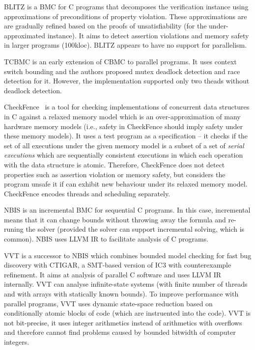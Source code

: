 BLITZ  is a BMC for C programs that decomposes the verification instance using approximations of preconditions of property violation.
These approximations are are gradually refined based on the proofs of unsatisfiability (for the under-approximated instance).
It aims to detect assertion violations and memory safety in larger programs (100kloc).
BLITZ appears to have no support for parallelism.

TCBMC  is an early extension of CBMC to parallel programs.
It uses context switch bounding and the authors proposed mutex deadlock detection and race detection for it.
However, the implementation supported only two theads without deadlock detection.

CheckFence~ is a tool for checking implementations of concurrent data structures in C against a relaxed memory model which is an over-approximation of many hardware memory models (i.e., safety in CheckFence should imply safety under these memory models).
It uses a test program as a specification -- it checks if the set of all executions under the given memory model is a subset of a set of \emph{serial executions} which are sequentially consistent executions in which each operation with the data structure is atomic.
Therefore, CheckFence does not detect properties such as assertion violation or memory safety, but considers the program unsafe it if can exhibit new behaviour under its relaxed memory model.
CheckFence encodes threads and scheduling separately.

NBIS  is an incremental BMC for sequential C programs.
In this case, incremental means that it can change bounds without throwing away the formula and re-runing the solver (provided the solver can support incremental solving, which is common).
NBIS uses LLVM IR to facilitate analysis of C programs.

VVT  is a successor to NBIS which combines bounded model checking for fast bug discovery with CTIGAR, a SMT-based version of IC3 with counterexample refinement.
It aims at analysis of parallel C software and uses LLVM IR internally.
VVT can analyse infinite-state systems (with finite number of threads and with arrays with statically known bounds).
To improve performance with parallel programs, VVT uses dynamic state-space reduction based on conditionally atomic blocks of code (which are instruented into the code).
VVT is not bit-precise, it uses integer arithmetics instead of arithmetics with overflows and therefore cannot find problems caused by bounded bitwidth of computer integers.

